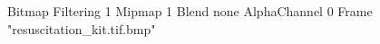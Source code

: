 {Bitmap
	{Filtering 1}
	{Mipmap 1}
	{Blend none}
	{AlphaChannel 0}
	{Frame "resuscitation_kit.tif.bmp"}
}
